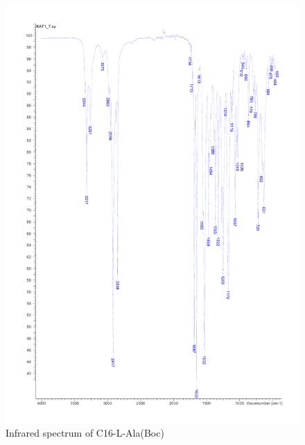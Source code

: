 \begin{figure}[ht!]
\centering
\includegraphics[scale=0.6]{IR/KAT1_7.pdf}
\caption{Infrared spectrum of C16-L-Ala(Boc)}
\end{figure}

